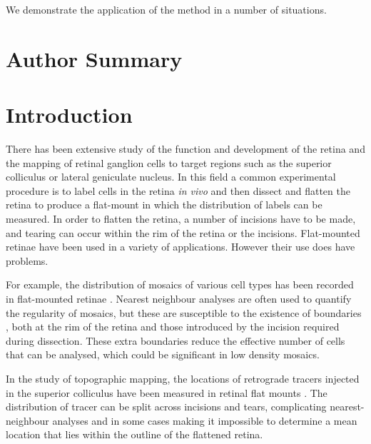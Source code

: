 \documentclass[10pt]{article}
\begin{document}
We demonstrate the application of the method in a number of
situations. 

\section*{Author Summary}

\section*{Introduction}

There has been extensive study of the function and development of the
retina and the mapping of retinal ganglion cells to target regions
such as the superior colliculus or lateral geniculate nucleus. In this
field a common experimental procedure is to label cells in the retina
\emph{in vivo} and then dissect and flatten the retina to produce a
flat-mount in which the distribution of labels can be measured. In
order to flatten the retina, a number of incisions have to be made,
and tearing can occur within the rim of the retina or the incisions.
Flat-mounted retinae have been used in a variety of
applications. However their use does have problems.

For example, the distribution of mosaics of various cell types has
been recorded in flat-mounted retinae
\cite{WassBoyc91func,RaveEtal03dete}.  Nearest neighbour analyses are
often used to quantify the regularity of mosaics, but these are
susceptible to the existence of boundaries \cite{Cook96spat}, both at
the rim of the retina and those introduced by the incision required
during dissection. These extra boundaries reduce the effective number
of cells that can be analysed, which could be significant in low
density mosaics.

In the study of topographic mapping, the locations of retrograde
tracers injected in the superior colliculus have been measured in
retinal flat mounts \cite{RebeEtal04rela,RashEtal05oppo}. The
distribution of tracer can be split across incisions and tears,
complicating nearest-neighbour analyses and in some cases making it
impossible to determine a mean location that lies within the outline
of the flattened retina.
\end{document}
